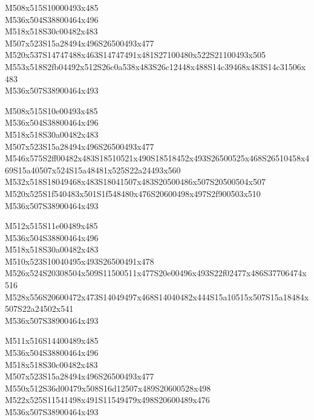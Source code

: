 \documentclass{article}
\begin{document}
\begin{multicols}{5}
\begin{center}

M508x515S10000493x485 %
\\M536x504S38800464x496 %
\\M518x518S30c00482x483 %
\\M507x523S15a28494x496S26500493x477 %
\\M520x537S14747488x463S14747491x481S27100480x522S21100493x505 %
\\M553x518S2fb04492x512S26c0a538x483S26c12448x488S14c39468x483S14c31506x483 %
\\M536x507S38900464x493 %
\vfil
\columnbreak

M508x515S10e00493x485 %
\\M536x504S38800464x496 %
\\M518x518S30a00482x483 %
\\M507x523S15a28494x496S26500493x477 %
\\M546x575S2ff00482x483S18510521x490S18518452x493S26500525x468S26510458x469S15a40507x524S15a48481x525S22a24493x560 %
\\M532x518S18049468x483S18041507x483S20500486x507S20500504x507 %
\\M520x525S1f540483x501S1f548480x476S20600498x497S2f900503x510 %
\\M536x507S38900464x493 %
\vfil
\columnbreak

M512x515S11e00489x485 %
\\M536x504S38800464x496 %
\\M518x518S30a00482x483 %
\\M510x523S10040495x493S26500491x478 %
\\M526x524S20308504x509S11500511x477S20e00496x493S22f02477x486S37706474x516 %
\\M528x556S20600472x473S14049497x468S14040482x444S15a10515x507S15a18484x507S22a24502x541 %
\\M536x507S38900464x493 %
\vfil
\columnbreak

M511x516S14400489x485 %
\\M536x504S38800464x496 %
\\M518x518S30c00482x483 %
\\M507x523S15a28494x496S26500493x477 %
\\M550x512S36d00479x508S16d12507x489S20600528x498 %
\\M522x525S11541498x491S11549479x498S20600489x476 %
\\M536x507S38900464x493 %
\vfil
\columnbreak


\end{center}
\end{multicols}
\end{document}
